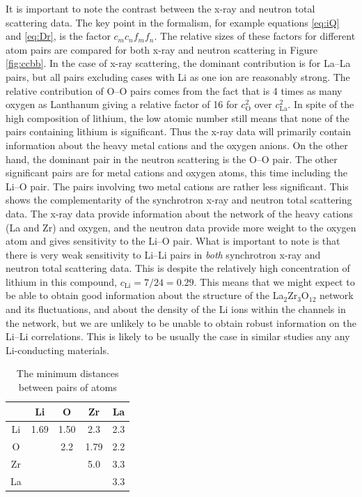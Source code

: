 \documentclass[twoside,twocolumn,9pt]{article}
\begin{document}
It is important to note the contrast between the x-ray and neutron total scattering data. The key point in the formalism, for example equations \ref{eq:iQ} and \ref{eq:Dr}, is the factor $c_m c_n f_m f_n$. The relative sizes of these factors for different atom pairs are compared for both x-ray and neutron scattering in Figure \ref{fig:ccbb}. In the case of x-ray scattering, the dominant contribution is for La--La pairs, but all pairs excluding cases with Li as one ion are reasonably strong. The relative contribution of O--O pairs comes from the fact that is 4 times as many oxygen as Lanthanum giving a relative factor of 16 for $c_\mathrm{O}^2$ over $c_\mathrm{La}^2$. In spite of the high composition of lithium, the low atomic number still means that none of the pairs containing lithium is significant. Thus the x-ray data will primarily contain information about the heavy metal cations and the oxygen anions. On the other hand, the dominant pair in the neutron scattering is the O--O pair. The other significant pairs are for metal cations and oxygen atoms, this time including the Li--O pair. The pairs involving two metal cations are rather less significant. This shows the complementarity of the synchrotron x-ray and neutron total scattering data. The x-ray data provide information about the network of the heavy cations (La and Zr) and oxygen, and the neutron data provide more weight to the oxygen atom and gives sensitivity to the Li--O pair. What is important to note is that there is very weak sensitivity to Li--Li pairs in \textit{both} synchrotron x-ray and neutron total scattering data. This is despite the relatively high concentration of lithium in this compound, $c_\mathrm{Li} = 7/24 = 0.29$. This means that we might expect to be able to obtain good information about the structure of the La$_2$Zr$_3$O$_{12}$ network and its fluctuations, and about the density of the Li ions within the channels in the network, but we are unlikely to be unable to obtain robust information on the Li--Li correlations. This is likely to be usually the case in similar studies any any Li-conducting materials.

\begin{table}[t]
\centering
\caption{The minimum distances between pairs of atoms} \label{tab:min_dis}
\begin{tabular}{c|cccc}
\hline
   & Li & O & Zr & La \\
\hline
Li & 1.69 & 1.50 & 2.3 & 2.3 \\
O  &      & 2.2  & 1.79& 2.2 \\
Zr &      &      & 5.0 & 3.3 \\
La &      &      &     & 3.3 \\
\hline
\end{tabular}
\end{table}
\end{document}
